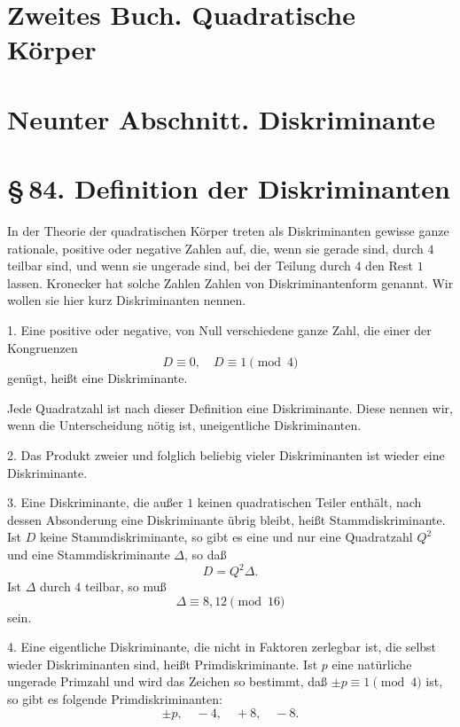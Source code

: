 \documentclass[11pt]{article}
\begin{document}
\section*{Zweites Buch. Quadratische Körper}
\section*{Neunter Abschnitt. Diskriminante}
\section*{\S\,84. Definition der Diskriminanten}

In der Theorie der quadratischen Körper treten als Diskriminanten gewisse ganze rationale, positive oder negative Zahlen auf, die, wenn sie gerade sind, durch \(4\) teilbar sind, und wenn sie ungerade sind, bei der Teilung durch \(4\) den Rest \(1\) lassen.  Kronecker hat solche Zahlen Zahlen von Diskriminantenform genannt.  Wir wollen sie hier kurz Diskriminanten nennen.

1. Eine positive oder negative, von Null verschiedene ganze Zahl, die einer der Kongruenzen
\begin{equation}
        D\equiv0,\quad D\equiv1\pmod4
\tag{1}
\end{equation}
genügt, heißt eine Diskriminante.

Jede Quadratzahl ist nach dieser Definition eine Diskriminante.  Diese nennen wir, wenn die Unterscheidung nötig ist, uneigentliche Diskriminanten.

2. Das Produkt zweier und folglich beliebig vieler Diskriminanten ist wieder eine Diskriminante.

3. Eine Diskriminante, die außer \(1\) keinen quadratischen Teiler enthält, nach dessen Absonderung eine Diskriminante übrig bleibt, heißt Stammdiskriminante.  Ist \(D\) keine Stammdiskriminante, so gibt es eine und nur eine Quadratzahl \(Q^2\) und eine Stammdiskriminante \(\Delta\), so daß
\begin{equation}
        D=Q^2\Delta.
\tag{2}
\end{equation}
Ist \(\Delta\) durch \(4\) teilbar, so muß
\begin{equation}
        \Delta\equiv8,12\pmod {16}
\tag{3}
\end{equation}
sein.

4. Eine eigentliche Diskriminante, die nicht in Faktoren zerlegbar ist, die selbst wieder Diskriminanten sind, heißt Primdiskriminante.  Ist \(p\) eine natürliche ungerade Primzahl und wird das Zeichen so bestimmt, daß \(\pm p\equiv1\pmod4\) ist, so gibt es folgende Primdiskriminanten:
\begin{equation}
        \pm p,\quad -4,\quad +8,\quad -8.
\tag{4}
\end{equation}
\end{document}
